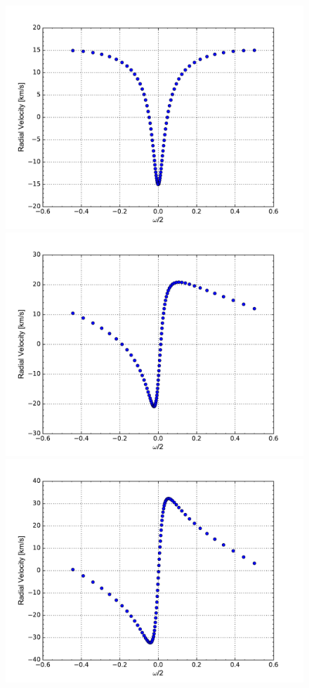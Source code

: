 \documentclass[onecolumn]{aastex6}
\begin{document}
\begin{figure}[ht]
  \centering
  \includegraphics[scale=0.3]{j.pdf}%
  \includegraphics[scale=0.3]{k.pdf}%
  \includegraphics[scale=0.3]{l.pdf} \\%

\end{figure}
\end{document}
